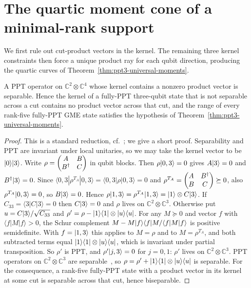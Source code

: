 \section{The quartic moment cone of a minimal-rank support}\label{sec:ppt3-app-moment}

We first rule out cut-product vectors in the kernel. The remaining three kernel constraints then force a unique
product ray for each qubit direction, producing the quartic curves of Theorem~\ref{thm:ppt3-universal-moments}.

\begin{lemma}\label{lem:ppt3-product-kernel}
A PPT operator on $\mathbb C^2\otimes\mathbb C^4$ whose kernel contains a nonzero product vector is separable. Hence the
kernel of a fully-PPT three-qubit state that is not separable across a cut contains no product vector across that cut,
and the range of every rank-five fully-PPT GME state satisfies the hypothesis of Theorem~\ref{thm:ppt3-universal-moments}.
\end{lemma}

\begin{proof}
This is a standard reduction, cf.~\cite{KCKL}; we give a short proof. Separability and PPT are invariant under local unitaries, so we may take the kernel vector to be $\lvert0\rangle\lvert3\rangle$. Write
$\rho=\begin{pmatrix}A&B\\B^{\dagger}&C\end{pmatrix}$ in qubit blocks. Then $\rho\lvert0,3\rangle=0$ gives $A\lvert3\rangle=0$ and $B^{\dagger}\lvert3\rangle=0$.
Since $\langle0,3|\rho^{T_A}|0,3\rangle=\langle0,3|\rho|0,3\rangle=0$ and $\rho^{T_A}=\begin{pmatrix}A&B^{\dagger}\\B&C
\end{pmatrix}\succeq0$, also $\rho^{T_A}\lvert0,3\rangle=0$, so $B\lvert3\rangle=0$. Hence $\rho\lvert1,3\rangle=\rho^{T_A}\lvert1,3\rangle=
\lvert1\rangle\otimes C\lvert3\rangle$. If $C_{33}=\langle3|C|3\rangle=0$ then $C\lvert3\rangle=0$ and $\rho$ lives on $\mathbb C^2\otimes\mathbb C^3$.
Otherwise put $u=C\lvert3\rangle/\sqrt{C_{33}}$ and $\rho'=\rho-\lvert1\rangle\langle1\rvert\otimes\lvert u\rangle\langle u\rvert$. For any $M\succeq0$ and vector $f$
with $\langle f|M|f\rangle>0$, the Schur complement $M-M\lvert f\rangle\langle f\rvert M/\langle f|M|f\rangle$ is positive semidefinite. With
$f=\lvert1,3\rangle$ this applies to $M=\rho$ and to $M=\rho^{T_A}$, and both subtracted terms equal $\lvert1\rangle\langle1\rvert\otimes\lvert u\rangle\langle u\rvert$,
which is invariant under partial transposition. So $\rho'$ is PPT, and $\rho'\lvert j,3\rangle=0$ for $j=0,1$: $\rho'$ lives on
$\mathbb C^2\otimes\mathbb C^3$. PPT operators on $\mathbb C^2\otimes\mathbb C^3$ are separable~\cite{HHH96}, so $\rho=\rho'+
\lvert1\rangle\langle1\rvert\otimes\lvert u\rangle\langle u\rvert$ is separable. For the consequence, a rank-five fully-PPT state with a product vector in
its kernel at some cut is separable across that cut, hence biseparable.
\end{proof}

